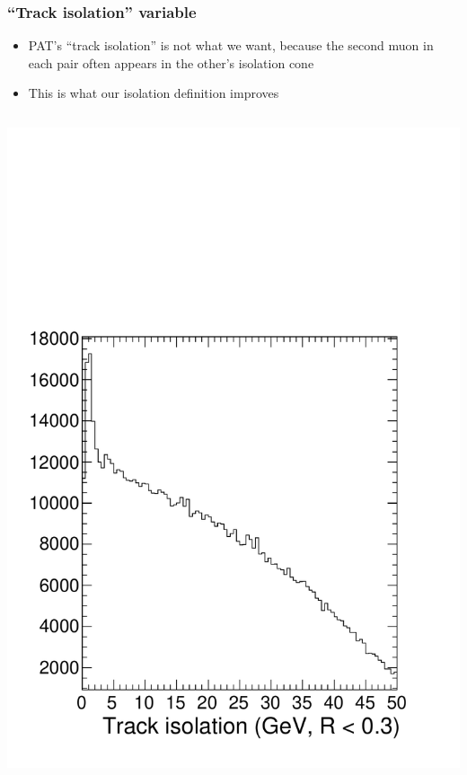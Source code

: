 \documentclass[compress]{beamer}
\begin{document}
\begin{frame}
\frametitle{``Track isolation'' variable}

\begin{itemize}
\item PAT's ``track isolation'' is not what we want, because the
  second muon in each pair often appears in the other's isolation
  cone
\item This is what our isolation definition improves
\end{itemize}

\begin{columns}
\includegraphics[width=\linewidth]{trackiso.pdf}

\end{columns}
\end{frame}
\end{document}
